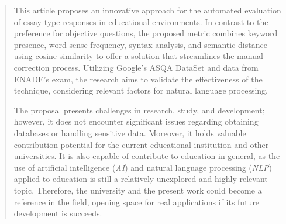 \documentclass[acronym,symbols]{fei}
\begin{document}
\begin{abstract}

This article proposes an innovative approach for the automated evaluation of essay-type responses in educational environments. In contrast to the preference for objective questions, the proposed metric combines keyword presence, word sense frequency, syntax analysis, and semantic distance using cosine similarity to offer a solution that streamlines the manual correction process. Utilizing Google's ASQA DataSet and data from ENADE's exam, the research aims to validate the effectiveness of the technique, considering relevant factors for natural language processing.

The proposal presents challenges in research, study, and development; however, it does not encounter significant issues regarding obtaining databases or handling sensitive data. Moreover, it holds valuable contribution potential for the current educational institution and other universities. It is also capable of contribute to education in general, as the use of artificial intelligence (\textit{AI}) and natural language processing (\textit{NLP}) applied to education is still a relatively unexplored and highly relevant topic. Therefore, the university and the present work could become a reference in the field, opening space for real applications if its future development is succeeds.


\end{abstract}

\listoffigures
\listoftables

\tableofcontents








\printbibliography
\end{document}
